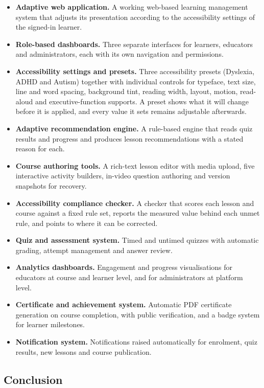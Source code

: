 \documentclass[12pt, oneside]{article} %
\begin{document}
\begin{itemize}
    \item \textbf{Adaptive web application.} A working web-based learning management system that adjusts its presentation according to the accessibility settings of the signed-in learner.
    \item \textbf{Role-based dashboards.} Three separate interfaces for learners, educators and administrators, each with its own navigation and permissions.
    \item \textbf{Accessibility settings and presets.} Three accessibility presets (Dyslexia, ADHD and Autism) together with individual controls for typeface, text size, line and word spacing, background tint, reading width, layout, motion, read-aloud and executive-function supports. A preset shows what it will change before it is applied, and every value it sets remains adjustable afterwards.
    \item \textbf{Adaptive recommendation engine.} A rule-based engine that reads quiz results and progress and produces lesson recommendations with a stated reason for each.
    \item \textbf{Course authoring tools.} A rich-text lesson editor with media upload, five interactive activity builders, in-video question authoring and version snapshots for recovery.
    \item \textbf{Accessibility compliance checker.} A checker that scores each lesson and course against a fixed rule set, reports the measured value behind each unmet rule, and points to where it can be corrected.
    \item \textbf{Quiz and assessment system.} Timed and untimed quizzes with automatic grading, attempt management and answer review.
    \item \textbf{Analytics dashboards.} Engagement and progress visualisations for educators at course and learner level, and for administrators at platform level.
    \item \textbf{Certificate and achievement system.} Automatic PDF certificate generation on course completion, with public verification, and a badge system for learner milestones.
    \item \textbf{Notification system.} Notifications raised automatically for enrolment, quiz results, new lessons and course publication.
\end{itemize}

\subsection{Conclusion}
\end{document}
